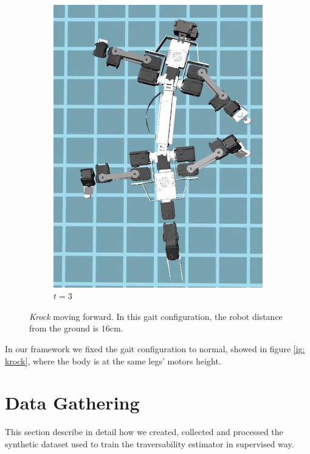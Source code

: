 \documentclass[../document.tex]{subfiles}
\begin{document}
\begin{figure}[htbp]
\begin{subfigure}[b]{0.3\textwidth}
			\includegraphics[width=\textwidth]{../img/krock-moving-3}
			\caption{$t=3$}
	    \end{subfigure}	
    \caption{\emph{Krock} moving forward. In this gait configuration, the robot distance from the ground is $16$cm.}
    \label{fig: krock-moving}
	\end{figure}
In our framework we fixed the gait configuration to normal, showed in figure \ref{ig: krock}, where the body is at the same legs' motors height.
\section{Data Gathering}
\label{sec: data-gathering}
This section describe in detail how we created, collected and processed the synthetic dataset used to train the traversability estimator in supervised way.
\end{document}
